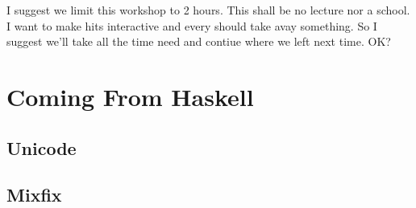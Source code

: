 \documentclass[12pt]{article}
\begin{document}
\tableofcontents{}

I suggest we limit this workshop to 2 hours. This shall be no lecture nor a school.
I want to make hits interactive and every should take avay something. So I suggest
we'll take all the time need and contiue where we left next time. OK?





\section{Coming From Haskell}
\subsection{Unicode}

\subsection{Mixfix}

\printbibliography{}
\end{document}
